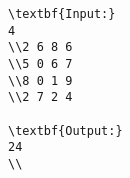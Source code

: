 \begin{verbatim}
\textbf{Input:}
4
\\2 6 8 6 
\\5 0 6 7 
\\8 0 1 9 
\\2 7 2 4

\textbf{Output:}
24
\\\end{verbatim}